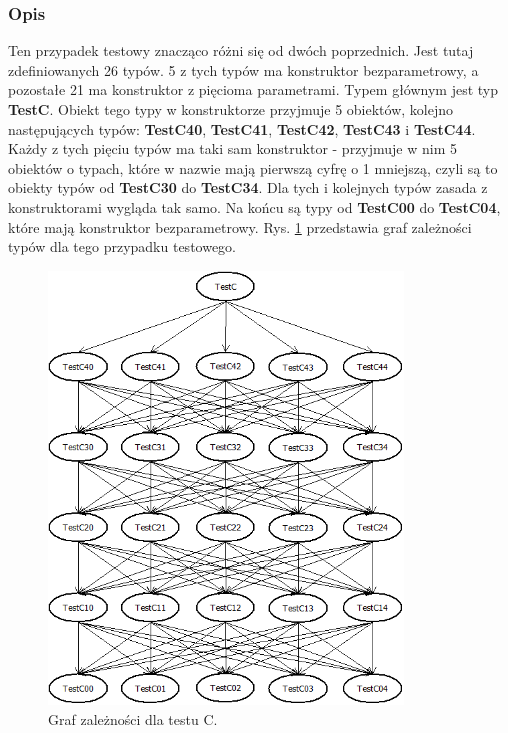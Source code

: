 \documentclass[12pt]{article}
\begin{document}
\subsubsection{Opis}
Ten przypadek testowy znacząco różni się od dwóch poprzednich. Jest tutaj zdefiniowanych 26 typów. 5 z tych typów ma konstruktor bezparametrowy, a pozostałe 21 ma konstruktor z pięcioma parametrami. Typem głównym jest typ \textbf{TestC}. Obiekt tego typy w konstruktorze przyjmuje 5 obiektów, kolejno następujących typów: \textbf{TestC40}, \textbf{TestC41}, \textbf{TestC42}, \textbf{TestC43} i \textbf{TestC44}. Każdy z tych pięciu typów ma taki sam konstruktor - przyjmuje w nim 5 obiektów o typach, które w nazwie mają pierwszą cyfrę o 1 mniejszą, czyli są to obiekty typów od \textbf{TestC30} do \textbf{TestC34}. Dla tych i kolejnych typów zasada z konstruktorami wygląda tak samo. Na końcu są typy od \textbf{TestC00} do \textbf{TestC04}, które mają konstruktor bezparametrowy. Rys. \ref{fig:testC} przedstawia graf zależności typów dla tego przypadku testowego.\\
\begin{figure}[H]
	\begin{center}
  		\includegraphics[height=11.5cm]{TestC.png}
  		\caption{Graf zależności dla testu C.}
  		\label{fig:testC}
	\end{center}
\end{figure}
\end{document}
